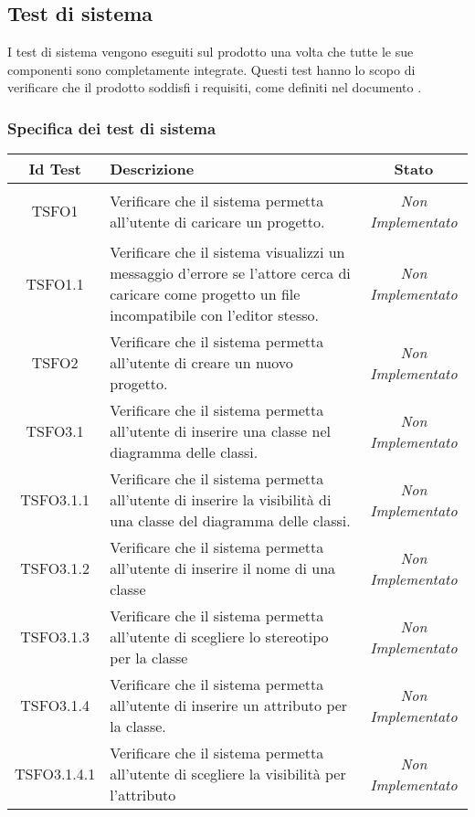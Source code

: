 \subsection{Test di sistema}
I test di sistema vengono eseguiti sul prodotto una volta che tutte le sue componenti sono completamente integrate. Questi test hanno lo scopo di verificare che il prodotto soddisfi i requisiti, come definiti nel documento \AdR.

\subsubsection{Specifica dei test di sistema}
\normalsize
\begin{longtable}{|c|>{}m{8cm}|c|}
\hline 
\textbf{Id Test} & \textbf{Descrizione} & \textbf{Stato}\\
\hline
\endhead
\hypertarget{TSFO1}{TSFO1} & Verificare che il sistema permetta all'utente di caricare un progetto. & \textit{Non Implementato}\\ \hline
\hypertarget{TSFO1.1}{TSFO1.1} & Verificare che il sistema visualizzi un messaggio d'errore se l'attore cerca di caricare come progetto un file incompatibile con l'editor stesso. & \textit{Non Implementato}\\ \hline
\hypertarget{TSFO2}{TSFO2} & Verificare che il sistema permetta all'utente di creare un nuovo progetto. & \textit{Non Implementato}\\ \hline
\hypertarget{TSFO3.1}{TSFO3.1} & Verificare che il sistema permetta all'utente di inserire una classe nel diagramma delle classi. & \textit{Non Implementato}\\ \hline
\hypertarget{TSFO3.1.1}{TSFO3.1.1} & Verificare che il sistema permetta all'utente di inserire la visibilità di una classe del diagramma delle classi. & \textit{Non Implementato}\\ \hline
\hypertarget{TSFO3.1.2}{TSFO3.1.2} & Verificare che il sistema permetta all'utente di inserire il nome di una classe & \textit{Non Implementato}\\ \hline
\hypertarget{TSFO3.1.3}{TSFO3.1.3} & Verificare che il sistema permetta all'utente di scegliere lo stereotipo per la classe & \textit{Non Implementato}\\ \hline
\hypertarget{TSFO3.1.4}{TSFO3.1.4} & Verificare che il sistema permetta all'utente di inserire un attributo per la classe. & \textit{Non Implementato}\\ \hline
\hypertarget{TSFO3.1.4.1}{TSFO3.1.4.1} & Verificare che il sistema permetta all'utente di scegliere la visibilità per l'attributo & \textit{Non Implementato}\\ \hline

\end{longtable}
